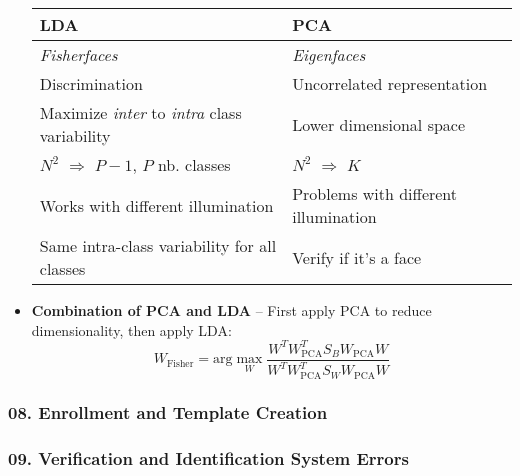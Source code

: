 \documentclass[a4paper]{article}
\begin{document}
\begin{itemize}
\begin{table}[htp]
\begin{tabular}{ll}
              \toprule
              \textbf{LDA} & \textbf{PCA} \\
              \midrule
              \emph{Fisherfaces}  & \emph{Eigenfaces}\\
              Discrimination & Uncorrelated representation\\
              Maximize \emph{inter} to \emph{intra} class variability & Lower dimensional space\\
              $N^2$ $\Rightarrow$ $P-1$, $P$ nb. classes & $N^2$ $\Rightarrow$ $K$\\
              Works with different illumination & Problems with different illumination \\
              Same intra-class variability for all classes      & Verify if it's a face \\
              \bottomrule
            \end{tabular}
          \end{table}
        \item \textbf{Combination of PCA and LDA} --
          First apply PCA to reduce dimensionality, then apply LDA:
          $$W_\text{Fisher}=\text{arg}\max_W{\frac{W^TW^T_\text{PCA}S_BW_\text{PCA}W}{W^TW^T_\text{PCA}S_WW_\text{PCA}W}}$$
      \end{itemize}
    \subsubsection*{08. Enrollment and Template Creation}
    \subsubsection*{09. Verification and Identification System Errors}
\end{document}
